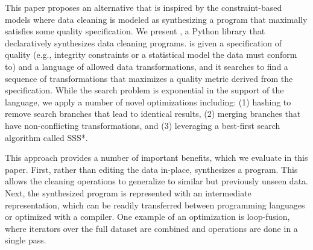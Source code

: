 This paper proposes an alternative that is inspired by the constraint-based models where data cleaning is modeled as synthesizing a program that maximally satisfies some quality specification.
We present \sys, a Python library that declaratively synthesizes data cleaning programs.  \sys is given a specification of quality (e.g., integrity constraints or a statistical model the data must conform to) and a language  of  allowed  data  transformations,  and  it  searches  to find a sequence of transformations that maximizes a quality metric derived from the specification.  While the search problem is exponential in the support of the language, we apply a number of novel optimizations including:  (1) hashing to remove search branches that lead to identical results, (2) merging branches that have non-conflicting  transformations,  and  (3)  leveraging  a best-first search algorithm called SSS*.


This approach provides a number of important benefits, which we evaluate in this paper.
First, rather than editing the data in-place, \sys synthesizes a program.
This allows the cleaning operations to generalize to similar but previously unseen data.
Next, the synthesized program is represented with an intermediate representation, which can be readily transferred  between  programming languages  or  optimized  with  a compiler.
One example of an optimization is loop-fusion, where iterators over the full dataset are combined and operations are done in a single pass.









